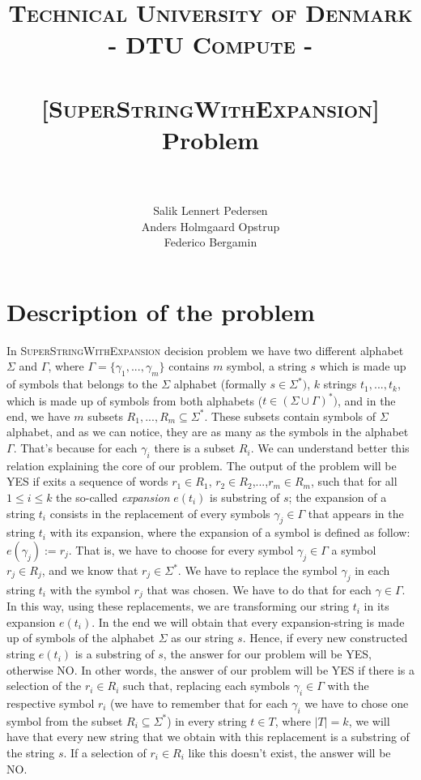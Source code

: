\documentclass[paper=a4, fontsize=11pt]{scrartcl}
\title{
		\usefont{OT1}{bch}{b}{n}
		\normalfont \normalsize \textsc{Technical University of Denmark - DTU Compute -} \\ [20pt]
		\horrule{0.5pt} \\[0.4cm]
		\LARGE \textsc{[SuperStringWithExpansion]} Problem \\
		\horrule{2pt} \\[0.5cm]
}
\author{
		\normalfont 							
        Salik Lennert Pedersen \\
        Anders Holmgaard Opstrup \\
        Federico Bergamin \\ [-3pt]		\normalsize
}
\date{}
\numberwithin{equation}{section}		%
\numberwithin{figure}{section}			%
\numberwithin{table}{section}				%
\begin{document}
\maketitle
\section{Description of the problem}
In \textsc{SuperStringWithExpansion} decision problem we have two different alphabet $\mathcal{\Sigma}$ and $\mathcal{\Gamma}$, where $\mathcal{\Gamma}=\{\gamma_1,...,\gamma_m\}$ contains $m$ symbol, a string $s$ which is made up of symbols that belongs to the  $\mathcal{\Sigma}$ alphabet (formally $s\in\mathcal{\Sigma^*})$, $k$ strings $t_1,...,t_k$, which is made up of symbols from both alphabets ($t \in (\Sigma \cup \Gamma)^*)$, and in the end, we have $m$ subsets $R_1,...,R_m \subseteq \mathcal{\Sigma^*}$. These subsets contain symbols of $\mathcal{\Sigma}$ alphabet, and as we can notice, they are as many as the symbols in the alphabet $\mathcal{\Gamma}$. That's because for each $\gamma_i$ there is a subset $R_i$. We can understand better this relation explaining the core of our problem. \newline
\noindent The output of the problem will be YES if exits a sequence of words $r_1\in R_1$, $r_2\in R_2$,...,$r_m\in R_m$, such that for all $1 \leq i \leq k$ the so-called \textit{expansion} $e(t_i)$ is substring of $s$; the expansion of a string $t_i$ consists in the replacement of every symbols $\gamma_j \in \mathcal{\Gamma}$ that appears in the string $t_i$ with its expansion, where the expansion of a symbol is defined as follow: $e(\gamma_j):=r_j$. That is, we have to choose for every symbol $\gamma_j\in \mathcal{\Gamma}$ a symbol $r_j\in R_j$, and we know that $r_j \in\mathcal{\Sigma^*}$. We have to replace the symbol $\gamma_j$ in each string $t_i$ with the symbol $r_j$ that was chosen. We have to do that for each $\gamma \in \mathcal{\Gamma}$. In this way, using these replacements, we are transforming our string $t_i$ in its expansion $e(t_i)$. \newline 
In the end we will obtain that every expansion-string is made up of symbols of the alphabet $\mathcal{\Sigma}$ as our string $s$. Hence, if every new constructed string $e(t_i)$ is a substring of $s$, the answer for our problem will be YES, otherwise NO.
\newline
In other words, the answer of our problem will be YES if there is a selection of the $r_i \in R_i$ such that, replacing each symbols $\gamma_i \in \Gamma$ with the respective symbol $r_i$ (we have to remember that for each $\gamma_i$ we have to chose one symbol from the subset $R_i \subseteq \Sigma^*$) in every string $t\in T$, where $|T|=k$, we will have that every new string that we obtain with this replacement is a substring of the string $s$. 
If a selection of $r_i \in R_i$ like this doesn't exist, the answer will be NO.
\end{document}
